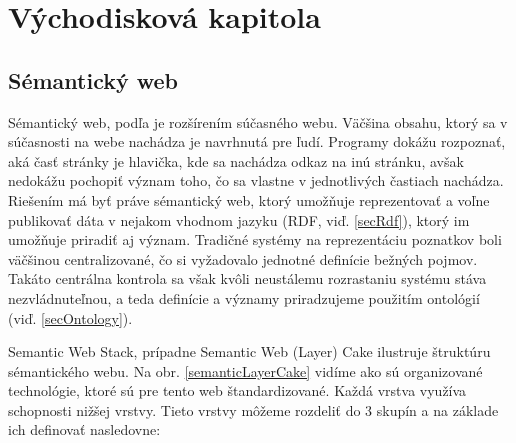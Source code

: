 \chapter{Východisková kapitola}

\label{kap:vychodiska} %


\section{Sémantický web} \label{secSemanticWeb}
Sémantický web, podľa \cite{scientificAmerican} je rozšírením súčasného webu. Väčšina obsahu, ktorý sa v
súčasnosti na webe nachádza je navrhnutá pre ľudí. Programy dokážu rozpoznať, aká
časť stránky je hlavička, kde sa nachádza odkaz na inú stránku, avšak nedokážu pochopiť význam
toho, čo sa vlastne v jednotlivých častiach nachádza. Riešením má byť práve sémantický web, ktorý umožňuje reprezentovať a voľne publikovať dáta v nejakom vhodnom jazyku (RDF, viď. \ref{secRdf}), ktorý im umožňuje priradiť aj význam. Tradičné systémy na reprezentáciu poznatkov boli väčšinou centralizované, čo si vyžadovalo jednotné definície bežných pojmov. Takáto centrálna kontrola sa však kvôli
neustálemu rozrastaniu systému stáva nezvládnuteľnou, a teda definície a významy priradzujeme použitím ontológií (viď. \ref{secOntology}).

Semantic Web Stack, prípadne Semantic Web (Layer) Cake ilustruje štruktúru sémantického webu. Na obr. \ref{semanticLayerCake} vidíme ako sú organizované technológie, ktoré sú pre tento web
štandardizované. Každá vrstva využíva schopnosti nižšej vrstvy. Tieto vrstvy môžeme rozdeliť do 3 skupín a na základe \cite{semanticWebLayer2} ich definovať nasledovne:

